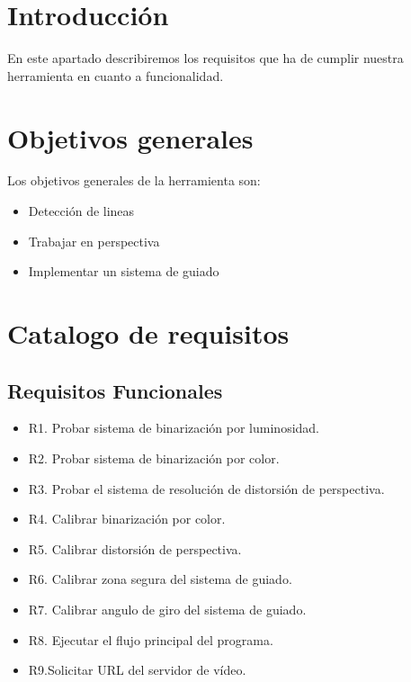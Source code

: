 
\section{Introducción}
En este apartado describiremos los requisitos que ha de cumplir nuestra herramienta en cuanto a funcionalidad.

\section{Objetivos generales}
Los objetivos generales de la herramienta son:
\begin{itemize}
	\item Detección de lineas
	\item Trabajar en perspectiva
	\item Implementar un sistema de guiado
\end{itemize}

\section{Catalogo de requisitos}

\subsection{Requisitos Funcionales}

\begin{itemize}
	
	\item R1. Probar sistema de binarización por luminosidad.
	
	\item R2. Probar sistema de binarización por color.
	
	\item R3. Probar el sistema de resolución de distorsión de perspectiva.
	
	\item R4. Calibrar binarización por color.
	
	\item R5. Calibrar distorsión de perspectiva.
	
	\item R6. Calibrar zona segura del sistema de guiado.
	
	\item R7. Calibrar angulo de giro del sistema de guiado.
	
	\item R8. Ejecutar el flujo principal del programa.
	
	\item R9.Solicitar URL del servidor de vídeo.

\end{itemize}

